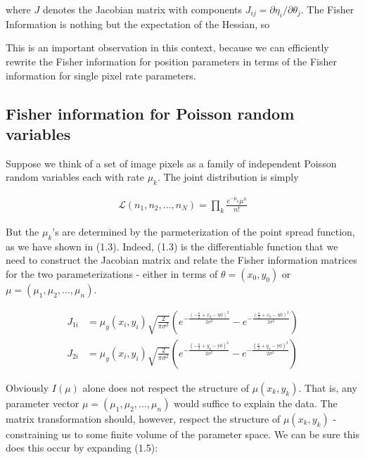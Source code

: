 \documentclass{ucetd}
\begin{document}
where $J$ denotes the Jacobian matrix with components $J_{ij} = \partial \eta_{i}/\partial \theta_{j}$. The Fisher Information is nothing but the expectation of the Hessian, so




This is an important observation in this context, because we can efficiently rewrite the Fisher information for position parameters in terms of the Fisher information for single pixel rate parameters.

\subsection{Fisher information for Poisson random variables}

Suppose we think of a set of image pixels as a family of independent Poisson random variables each with rate $\mu_{k}$. The joint distribution is simply

\begin{align*}
\mathcal{L}(n_{1},n_{2},...,n_{N}) = \prod_{k} \frac{e^{-\mu_{k}}\mu^{n}}{n!}
\end{align*}

But the $\mu_{k}$'s are determined by the parmeterization of the point spread function, as we have shown in (1.3). Indeed, (1.3) is the differentiable function that we need to construct the Jacobian matrix and relate the Fisher information matrices for the two parameterizations - either in terms of $\theta = (x_{0},y_{0}) $ or $\mu = (\mu_{1}, \mu_{2}, ..., \mu_{n})$.  

\begin{align*}
J_{1i} &= \mu_{y}(x_{i},y_{i})\sqrt{\frac{2}{\pi\sigma^{2}}}\left(e^{-\frac{\left(-\frac{a}{2}+x_{k}-\text{x0}\right)^2}{2 \sigma ^2}}-e^{-\frac{\left(\frac{a}{2}+x_{k}-\text{x0}\right)^2}{2 \sigma ^2}}\right)\\
J_{2i} &= \mu_{y}(x_{i},y_{i})\sqrt{\frac{2}{\pi\sigma^{2}}}\left(e^{-\frac{\left(-\frac{a}{2}+y_{k}-\text{y0}\right)^2}{2 \sigma ^2}}-e^{-\frac{\left(\frac{a}{2}+y_{k}-\text{y0}\right)^2}{2 \sigma ^2}}\right)
\end{align*}

Obviously $I(\mu)$ alone does not respect the structure of $\mu(x_{k},y_{k})$. That is, any parameter vector $\mu = (\mu_{1}, \mu_{2}, ..., \mu_{n})$ would suffice to explain the data. The matrix transformation should, however, respect the structure of $\mu(x_{k},y_{k})$ - constraining us to some finite volume of the parameter space. We can be sure this does this occur by expanding (1.5):
\end{document}
